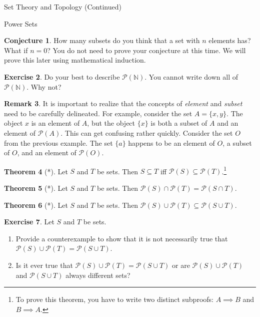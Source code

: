 \documentclass[11pt]{article}
\theoremstyle{definition}
\newtheorem{theorem}{Theorem}[section]
\newtheorem{conjecture}[theorem]{Conjecture}
\newtheorem{exercise}[theorem]{Exercise}
\newtheorem{remark}[theorem]{Remark}
\begin{document}
\begin{section}{Set Theory and Topology (Continued)}
\begin{subsection}{Power Sets}
\begin{conjecture}
How many subsets do you think that a set with $n$ elements has?  What if $n=0$?  You do not need to prove your conjecture at this time.  We will prove this later using mathematical induction.
\end{conjecture}

\begin{exercise}
Do your best to describe $\mathcal{P}(\mathbb{N})$.  You cannot write down all of $\mathcal{P}(\mathbb{N})$.  Why not?
\end{exercise}

\begin{remark}
It is important to realize that the concepts of \emph{element} and \emph{subset} need to be carefully delineated.  For example, consider the set $A=\{x,y\}$.  The object $x$ is an element of $A$, but the object $\{x\}$ is both a subset of $A$ and an element of $\mathcal{P}(A)$.  This can get confusing rather quickly.  Consider the set $O$ from the previous example.  The set $\{a\}$ happens to be an element of $O$, a subset of $O$, and an element of  $\mathcal{P}(O)$.
\end{remark}

\begin{theorem}[*]
Let $S$ and $T$ be sets.  Then $S\subseteq T$ iff $\mathcal{P}(S)\subseteq \mathcal{P}(T)$.\footnote{To prove this theorem, you have to write two distinct subproofs: $A\implies B$ and $B\implies A$.}
\end{theorem}

\begin{theorem}[*]
Let $S$ and $T$ be sets.  Then $\mathcal{P}(S)\cap\mathcal{P}(T)=\mathcal{P}(S\cap T)$.
\end{theorem}

\begin{theorem}[*]
Let $S$ and $T$ be sets.  Then $\mathcal{P}(S)\cup\mathcal{P}(T)\subseteq \mathcal{P}(S\cup T)$.
\end{theorem}


\begin{exercise}
Let $S$ and $T$ be sets.
\begin{enumerate}
\item Provide a counterexample to show that it is not necessarily true that $\mathcal{P}(S)\cup\mathcal{P}(T)= \mathcal{P}(S\cup T)$.
\item Is it ever true that $\mathcal{P}(S)\cup\mathcal{P}(T)= \mathcal{P}(S\cup T)$ or are $\mathcal{P}(S)\cup\mathcal{P}(T)$ and $\mathcal{P}(S\cup T)$ always different sets?
\end{enumerate}
\end{exercise}


\end{subsection}
\end{section}
\end{document}
